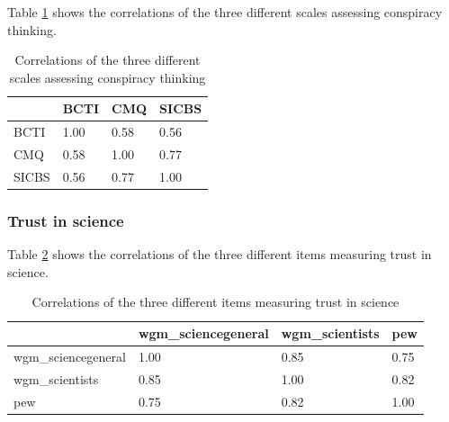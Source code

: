 \documentclass[
  doc,floatsintext]{apa6}
\begin{document}
Table \ref{tab:correlation-conspiracy} shows the correlations of the three different scales assessing conspiracy thinking.

\begin{table}[h]

\begin{center}
\begin{threeparttable}

\caption{\label{tab:correlation-conspiracy}Correlations of the three different scales assessing conspiracy thinking}

\begin{tabular}{llll}
\toprule
 & \multicolumn{1}{c}{BCTI} & \multicolumn{1}{c}{CMQ} & \multicolumn{1}{c}{SICBS}\\
\midrule
BCTI & 1.00 & 0.58 & 0.56\\
CMQ & 0.58 & 1.00 & 0.77\\
SICBS & 0.56 & 0.77 & 1.00\\
\bottomrule
\end{tabular}

\end{threeparttable}
\end{center}

\end{table}

\subsubsection{Trust in science}\label{trust-in-science-2}

Table \ref{tab:correlation-trust} shows the correlations of the three different items measuring trust in science.

\begin{table}[h]

\begin{center}
\begin{threeparttable}

\caption{\label{tab:correlation-trust}Correlations of the three different items measuring trust in science}

\begin{tabular}{llll}
\toprule
 & \multicolumn{1}{c}{wgm\_sciencegeneral} & \multicolumn{1}{c}{wgm\_scientists} & \multicolumn{1}{c}{pew}\\
\midrule
wgm\_sciencegeneral & 1.00 & 0.85 & 0.75\\
wgm\_scientists & 0.85 & 1.00 & 0.82\\
pew & 0.75 & 0.82 & 1.00\\
\bottomrule
\end{tabular}

\end{threeparttable}
\end{center}

\end{table}
\end{document}
